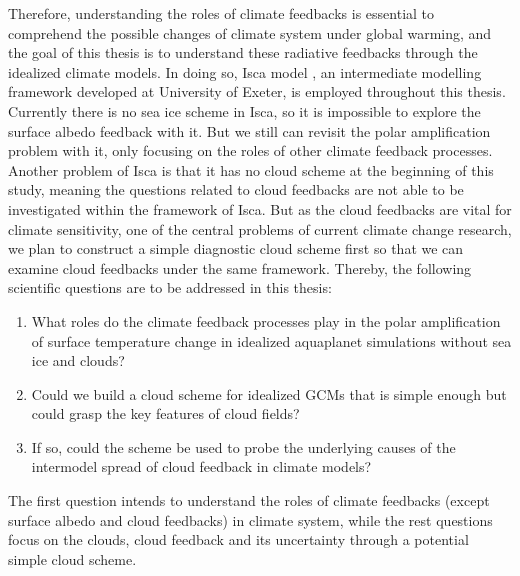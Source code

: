 
Therefore, understanding the roles of climate feedbacks is essential to comprehend the possible changes of climate system under global warming, and the goal of this thesis is to understand these radiative feedbacks through the idealized climate models. In doing so, Isca model \citep{Vallis2018}, an intermediate modelling framework developed at University of Exeter, is employed throughout this thesis. Currently there is no sea ice scheme in Isca, so it is impossible to explore the surface albedo feedback with it. But we still can revisit the polar amplification problem with it, only focusing on the roles of other climate feedback processes. Another problem of Isca is that it has no cloud scheme at the beginning of this study, meaning the questions related to cloud feedbacks are not able to be investigated within the framework of Isca. But as the cloud feedbacks are vital for climate sensitivity, one of the central problems of current climate change research,  we plan to construct a simple diagnostic cloud scheme first so that we can examine cloud feedbacks under the same framework. Thereby, the following scientific questions are to be addressed in this thesis:
\begin{enumerate}
    \item What roles do the climate feedback processes play in the polar amplification of surface temperature change in idealized aquaplanet simulations without sea ice and clouds?
    \item Could we build a cloud scheme for idealized GCMs that is simple enough but could grasp the key features of cloud fields?
    \item If so, could the scheme be used to probe the underlying causes of the intermodel spread of cloud feedback in climate models? 
\end{enumerate}
The first question intends to understand the roles of climate feedbacks (except surface albedo and cloud feedbacks) in climate system, while the rest questions focus on the clouds, cloud feedback and its uncertainty through a potential simple cloud scheme.

